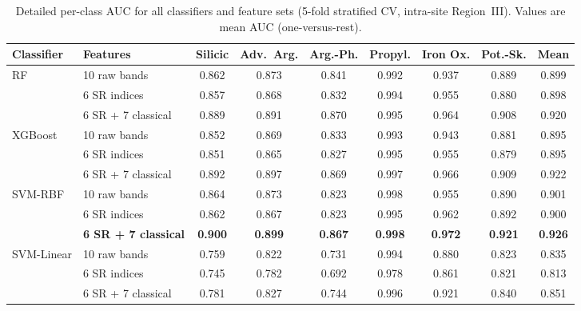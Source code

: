 \documentclass[review,authoryear]{elsarticle}
\begin{document}
\begin{table}[ht]
\centering
\caption{Detailed per-class AUC for all classifiers and feature sets (5-fold stratified CV, intra-site Region~III). Values are mean AUC (one-versus-rest).}
\label{tab:s_multiclf_detail}
\begin{tabular}{llccccccc}
\toprule
Classifier & Features & Silicic & Adv.\ Arg. & Arg.-Ph. & Propyl. & Iron Ox. & Pot.-Sk. & Mean \\
\midrule
\multirow{3}{*}{RF}
  & 10 raw bands       & 0.862 & 0.873 & 0.841 & 0.992 & 0.937 & 0.889 & 0.899 \\
  & 6 SR indices        & 0.857 & 0.868 & 0.832 & 0.994 & 0.955 & 0.880 & 0.898 \\
  & 6 SR + 7 classical  & 0.889 & 0.891 & 0.870 & 0.995 & 0.964 & 0.908 & 0.920 \\
\midrule
\multirow{3}{*}{XGBoost}
  & 10 raw bands       & 0.852 & 0.869 & 0.833 & 0.993 & 0.943 & 0.881 & 0.895 \\
  & 6 SR indices        & 0.851 & 0.865 & 0.827 & 0.995 & 0.955 & 0.879 & 0.895 \\
  & 6 SR + 7 classical  & 0.892 & 0.897 & 0.869 & 0.997 & 0.966 & 0.909 & 0.922 \\
\midrule
\multirow{3}{*}{SVM-RBF}
  & 10 raw bands       & 0.864 & 0.873 & 0.823 & 0.998 & 0.955 & 0.890 & 0.901 \\
  & 6 SR indices        & 0.862 & 0.867 & 0.823 & 0.995 & 0.962 & 0.892 & 0.900 \\
  & \textbf{6 SR + 7 classical}  & \textbf{0.900} & \textbf{0.899} & \textbf{0.867} & \textbf{0.998} & \textbf{0.972} & \textbf{0.921} & \textbf{0.926} \\
\midrule
\multirow{3}{*}{SVM-Linear}
  & 10 raw bands       & 0.759 & 0.822 & 0.731 & 0.994 & 0.880 & 0.823 & 0.835 \\
  & 6 SR indices        & 0.745 & 0.782 & 0.692 & 0.978 & 0.861 & 0.821 & 0.813 \\
  & 6 SR + 7 classical  & 0.781 & 0.827 & 0.744 & 0.996 & 0.921 & 0.840 & 0.851 \\
\bottomrule
\end{tabular}
\end{table}
\end{document}
